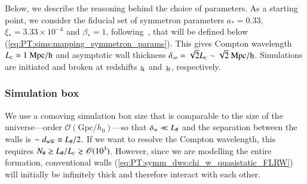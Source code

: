 




Below, we describe the reasoning behind the choice of parameters. As a starting point, we consider the fiducial set of symmetron parameters $a_\ast =0.33$, $\xi_\ast = 3.33\times 10^{-4}$ and $\beta_\ast = 1$, following~\citet{christiansenCosmologicalSimulationsPhase2024}, that will be defined below (\cref{eq:PT:sims:mapping_symmetron_params}). This gives Compton wavelength $L_{\text{\tiny{C}}}\approx 1~\mathrm{Mpc/h}$ and asymptotic wall thickness $\delta_\infty = \sqrt{2} L_{\text{\tiny{C}}}\sim \sqrt{2} ~\mathrm{Mpc/h}$. %
Simulations are initiated and broken at redshifts $\mathfrak{z}_\mathrm{i}$ and $\mathfrak{z}_\mathrm{f}$, respectively.

\subsubsection{Simulation box}

    We use a comoving simulation box size that is comparable to the size of the universe---order $\mathscr{O}(\mathrm{Gpc}/h_0)$---so that $\delta_\mathrm{w}\ll L_\#$ and the separation between the walls is $\sim d_\mathrm{w\overline{w}} \equiv  L_{\#}/2$. If we want to resolve the Compton wavelength, this requires $N_\# \geq L_\#/L_{\text{\tiny{C}}} \gtrsim \mathscr{O}(10^3)$. However, since we are modelling the entire formation, conventional walls (\cref{eq:PT:symm_dws:chi_w_quasistatic_FLRW}) will initially be infinitely thick and therefore interact with each other. 


